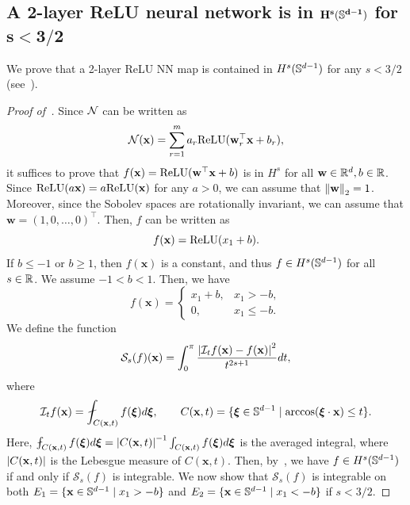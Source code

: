 \subsection{A 2-layer ReLU neural network is in $\mathbf{H^s({\mathbb{S}}^{d-1})}$ for $\mathbf{s < 3/2}$}
We prove that a 2-layer ReLU NN map is contained in $H^s({\mathbb{S}}^{d-1})$ for any $s < 3/2$ (see~).
\begin{proof}[Proof of~]
Since ${\mathcal{N}}$ can be written as
\begin{equation*}
    {\mathcal{N}}(\mathbf{x}) = \sum_{r=1}^m a_r {\rm ReLU}(\mathbf{w}_r^\top \mathbf{x} + b_r),
\end{equation*}
it suffices to prove that $f(\mathbf{x}) = {\rm ReLU}(\mathbf{w}^\top \mathbf{x} + b)$ is in $H^s$ for all $\mathbf{w} \in \mathbb{R}^d, b \in \mathbb{R}$. Since ${\rm ReLU}(a \mathbf{x}) = a{\rm ReLU}(\mathbf{x})$ for any $a>0$, we can assume that $\left\lVert\mathbf{w}\right\rVert_2 = 1$. Moreover, since the Sobolev spaces are rotationally invariant, we can assume that $\mathbf{w} = (1,0, \ldots, 0)^\top$. Then, $f$ can be written as
\begin{equation*}
    f(\mathbf{x}) = {\rm ReLU}(x_1 + b).
\end{equation*}
If $b \leq -1$ or $b \geq 1$, then $f(\mathbf{x})$ is a constant, and thus $f \in H^s({\mathbb{S}}^{d-1})$ for all $s \in \mathbb{R}$. We assume $-1 < b < 1$. Then, we have
\begin{equation*}
    f(\mathbf{x}) =
    \begin{cases}
    x_1+b, & x_1 > -b, \\
    0 , & x_1 \leq -b.
    \end{cases}
\end{equation*}
We define the function
\begin{equation*}
    \mathcal{S}_s(f)(\mathbf{x}) = \int_0^\pi \frac{\left|\mathcal{I}_tf(\mathbf{x}) - f(\mathbf{x})\right|^2}{t^{2s+1}} dt,
\end{equation*}
where
\begin{equation*}
    \mathcal{I}_tf(\mathbf{x}) = \fint_{C(\mathbf{x},t)} f(\boldsymbol{\xi}) d\boldsymbol{\xi}, \qquad C(\mathbf{x},t) = \{\boldsymbol{\xi} \in \sS^{d-1} \mid \arccos (\boldsymbol{\xi} \cdot \mathbf{x}) \leq t\}.
\end{equation*}
Here, $\fint_{C(\mathbf{x},t)} f(\boldsymbol{\xi}) d\boldsymbol{\xi} = \abs{C(\mathbf{x},t)}^{-1} \int_{C(\mathbf{x},t)} f(\boldsymbol{\xi}) d\boldsymbol{\xi}$ is the averaged integral, where $\left|C(\mathbf{x},t)\right|$ is the Lebesgue measure of $C(\mathbf{x},t)$. Then, by~\cite[Thm.~1.1]{barcelo2020characterization}, we have $f \in H^s({\mathbb{S}}^{d-1})$ if and only if $\mathcal{S}_s(f)$ is integrable. We now show that $\mathcal{S}_s(f)$ is integrable on both $E_1 = \{\mathbf{x} \in {\mathbb{S}}^{d-1} \mid x_1 > -b\}$ and $E_2 = \{\mathbf{x} \in {\mathbb{S}}^{d-1} \mid x_1 < -b\}$ if $s < 3/2$.


\end{proof}
